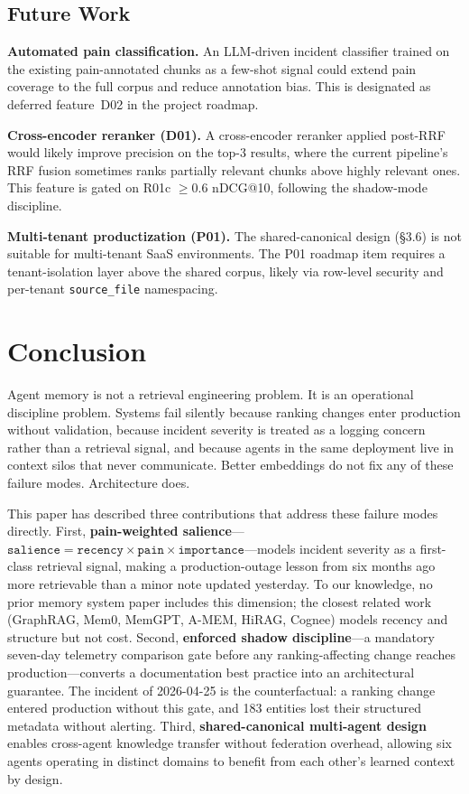 \documentclass{article}
\begin{document}
\subsection{Future Work}

\textbf{Automated pain classification.} An LLM-driven incident classifier trained on the
existing pain-annotated chunks as a few-shot signal could extend pain coverage to the full
corpus and reduce annotation bias. This is designated as deferred feature~D02 in the
project roadmap.

\textbf{Cross-encoder reranker (D01).} A cross-encoder reranker applied post-RRF would
likely improve precision on the top-3 results, where the current pipeline's RRF fusion
sometimes ranks partially relevant chunks above highly relevant ones. This feature is gated
on R01c $\geq 0.6$ nDCG@10, following the shadow-mode discipline.

\textbf{Multi-tenant productization (P01).} The shared-canonical design (\S3.6) is not
suitable for multi-tenant SaaS environments. The P01 roadmap item requires a
tenant-isolation layer above the shared corpus, likely via row-level security and per-tenant
\texttt{source\_file} namespacing.

\section{Conclusion}

Agent memory is not a retrieval engineering problem. It is an operational discipline
problem. Systems fail silently because ranking changes enter production without validation,
because incident severity is treated as a logging concern rather than a retrieval signal,
and because agents in the same deployment live in context silos that never communicate.
Better embeddings do not fix any of these failure modes. Architecture does.

This paper has described three contributions that address these failure modes directly.
First, \textbf{pain-weighted salience}---$\texttt{salience} = \texttt{recency} \times
\texttt{pain} \times \texttt{importance}$---models incident severity as a first-class
retrieval signal, making a production-outage lesson from six months ago more retrievable
than a minor note updated yesterday. To our knowledge, no prior memory system paper
includes this dimension; the closest related work (GraphRAG, Mem0, MemGPT, A-MEM, HiRAG,
Cognee) models recency and structure but not cost. Second, \textbf{enforced shadow
discipline}---a mandatory seven-day telemetry comparison gate before any ranking-affecting
change reaches production---converts a documentation best practice into an architectural
guarantee. The incident of 2026-04-25 is the counterfactual: a ranking change entered
production without this gate, and 183 entities lost their structured metadata without
alerting. Third, \textbf{shared-canonical multi-agent design} enables cross-agent
knowledge transfer without federation overhead, allowing six agents operating in distinct
domains to benefit from each other's learned context by design.
\end{document}

